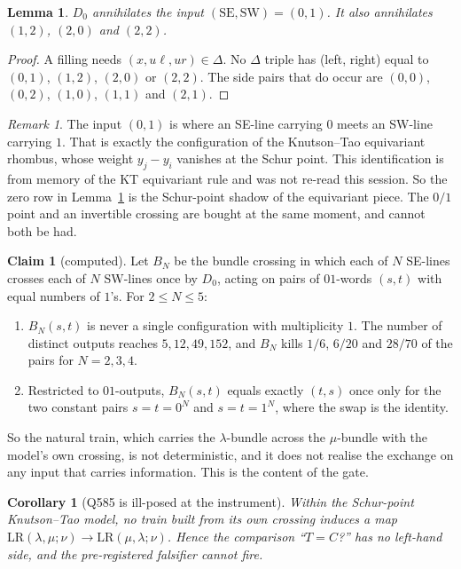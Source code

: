 \documentclass[11pt]{article}
\newtheorem{lemma}[theorem]{Lemma}
\newtheorem{corollary}[theorem]{Corollary}
\theoremstyle{definition}
\newtheorem{claim}{Claim}
\theoremstyle{remark}
\newtheorem{remark}[theorem]{Remark}
\newcommand{\LR}{\mathrm{LR}}
\begin{document}
\begin{lemma}\label{lem:kill}
$D_0$ annihilates the input $(\text{SE},\text{SW})=(0,1)$. It also annihilates $(1,2)$,
$(2,0)$ and $(2,2)$.
\end{lemma}
\begin{proof}
A filling needs $(x,u\ell,ur)\in\Delta$. No $\Delta$ triple has (left, right) equal to
$(0,1)$, $(1,2)$, $(2,0)$ or $(2,2)$. The side pairs that do occur are $(0,0)$,
$(0,2)$, $(1,0)$, $(1,1)$ and $(2,1)$.
\end{proof}

\begin{remark}
The input $(0,1)$ is where an SE-line carrying $0$ meets an SW-line carrying $1$. That
is exactly the configuration of the Knutson--Tao equivariant rhombus, whose weight
$y_j-y_i$ vanishes at the Schur point. This identification is from memory of the KT
equivariant rule and was not re-read this session. So the zero row in
Lemma~\ref{lem:kill} is the Schur-point shadow of the equivariant piece. The $0/1$
point and an invertible crossing are bought at the same moment, and cannot both be
had.
\end{remark}

\begin{claim}[computed]\label{cl:bundle}
Let $B_N$ be the bundle crossing in which each of $N$ SE-lines crosses each of $N$
SW-lines once by $D_0$, acting on pairs of $01$-words $(s,t)$ with equal numbers of
$1$'s. For $2\le N\le5$:
\begin{enumerate}
\item $B_N(s,t)$ is never a single configuration with multiplicity $1$. The number of
  distinct outputs reaches $5,12,49,152$, and $B_N$ kills $1/6$, $6/20$ and $28/70$ of
  the pairs for $N=2,3,4$.
\item Restricted to $01$-outputs, $B_N(s,t)$ equals exactly $(t,s)$ once only for the
  two constant pairs $s=t=0^N$ and $s=t=1^N$, where the swap is the identity.
\end{enumerate}
\end{claim}

\noindent So the natural train, which carries the $\lambda$-bundle across the
$\mu$-bundle with the model's own crossing, is not deterministic, and it does not
realise the exchange on any input that carries information. This is the content of
the gate.

\begin{corollary}[Q585 is ill-posed at the instrument]
Within the Schur-point Knutson--Tao model, no train built from its own crossing induces
a map $\LR(\lambda,\mu;\nu)\to\LR(\mu,\lambda;\nu)$. Hence the comparison ``$T=C$?''
has no left-hand side, and the pre-registered falsifier cannot fire.
\end{corollary}
\end{document}
